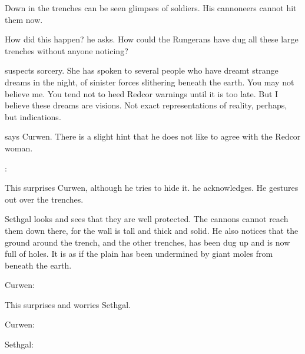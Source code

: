 Down in the trenches can be seen glimpses of soldiers. 
His cannoneers cannot hit them now. 

How did this happen? he asks.
How could the Rungerans have dug all these large trenches without anyone noticing?

\Esmerel suspects sorcery. 
She has spoken to several people who have dreamt strange dreams in the night, of sinister forces slithering beneath the earth.
You may not believe me.
You tend not to heed Redcor warnings until it is too late. 
But I believe these dreams are visions. 
Not exact representations of reality, perhaps, but indications.

 says Curwen.
There is a slight hint that he does not like to agree with the Redcor woman.

\Esmerel:

This surprises Curwen, although he tries to hide it. 
 he acknowledges.
He gestures out over the trenches. 

Sethgal looks and sees that they are well protected.
The cannons cannot reach them down there, for the wall is tall and thick and solid.
He also notices that the ground around the trench, and the other trenches, has been dug up and is now full of holes. 
It is as if the plain has been undermined by giant moles from beneath the earth. 

Curwen:

This surprises and worries Sethgal. 

Curwen:

Sethgal: 




